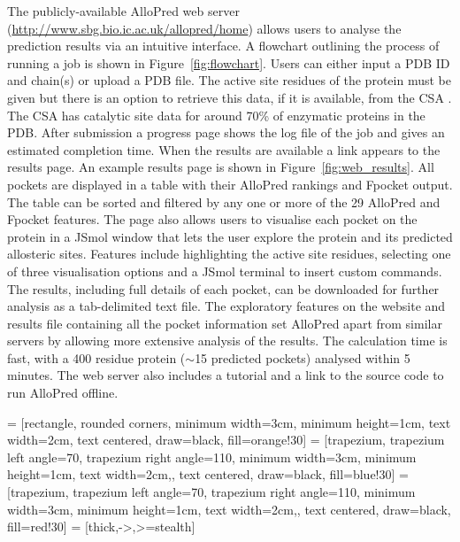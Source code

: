 The publicly-available AlloPred web server (\url{http://www.sbg.bio.ic.ac.uk/allopred/home}) allows users to analyse the prediction results via an intuitive interface.
A flowchart outlining the process of running a job is shown in Figure~\ref{fig:flowchart}.
Users can either input a PDB ID and chain(s) or upload a PDB file.
The active site residues of the protein must be given but there is an option to retrieve this data, if it is available, from the CSA \cite{Furnham2014}.
The CSA has catalytic site data for around 70\% of enzymatic proteins in the PDB.
After submission a progress page shows the log file of the job and gives an estimated completion time.
When the results are available a link appears to the results page.
An example results page is shown in Figure~\ref{fig:web_results}.
All pockets are displayed in a table with their AlloPred rankings and Fpocket output.
The table can be sorted and filtered by any one or more of the 29 AlloPred and Fpocket features.
The page also allows users to visualise each pocket on the protein in a JSmol window that lets the user explore the protein and its predicted allosteric sites.
Features include highlighting the active site residues, selecting one of three visualisation options and a JSmol terminal to insert custom commands.
The results, including full details of each pocket, can be downloaded for further analysis as a tab-delimited text file.
The exploratory features on the website and results file containing all the pocket information set AlloPred apart from similar servers by allowing more extensive analysis of the results.
The calculation time is fast, with a 400 residue protein ($\sim$15 predicted pockets) analysed within 5 minutes.
The web server also includes a tutorial and a link to the source code to run AlloPred offline.


 = [rectangle, rounded corners, minimum width=3cm, minimum height=1cm, text width=2cm, text centered, draw=black, fill=orange!30]
 = [trapezium, trapezium left angle=70, trapezium right angle=110, minimum width=3cm, minimum height=1cm, text width=2cm,, text centered, draw=black, fill=blue!30]
 = [trapezium, trapezium left angle=70, trapezium right angle=110, minimum width=3cm, minimum height=1cm, text width=2cm,, text centered, draw=black, fill=red!30]
 = [thick,->,>=stealth]

